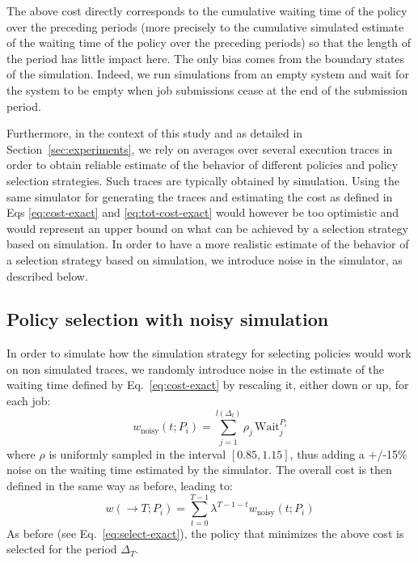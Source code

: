 \documentclass[sigconf,review,anonymous]{acmart}
\begin{document}
The above cost directly corresponds to the cumulative waiting time of the
policy over the preceding periods (more precisely to the cumulative simulated
estimate of the waiting time of the policy over the preceding periods) so that
the length of the period has little impact here. The only bias comes from the
boundary states of the simulation. Indeed, we run simulations from an empty
system and wait for the system to be empty when job submissions cease at the
end of the submission period.

Furthermore, in the context of this study and as detailed in
Section~\ref{sec:experiments}, we rely on averages over several execution
traces in order to obtain reliable estimate of the behavior of different
policies and policy selection strategies. Such traces are typically obtained by
simulation. Using the same simulator for generating the traces and estimating
the cost as defined in Eqs \ref{eq:cost-exact} and \ref{eq:tot-cost-exact}
would however be too optimistic and would represent an upper bound on what can
be achieved by a selection strategy based on simulation. In order to have a
more realistic estimate of the behavior of a selection strategy based on
simulation, we introduce noise in the simulator, as described below.

\subsection{Policy selection with noisy simulation}
\label{sub:noisy}

In order to simulate how the simulation strategy for selecting policies would
work on non simulated traces, we randomly introduce noise in the estimate of
the waiting time defined by Eq.~\ref{eq:cost-exact} by rescaling it, either
down or up, for each job:
%
\begin{equation} \label{eq:cost-noisy} w_{\mbox{noisy}}(t;P_i) =
\sum_{j=1}^{l(\Delta_t)} \rho_j \, \mbox{Wait}_j^{P_i} \end{equation}
%
where $\rho$ is uniformly sampled in the interval $[0.85,1.15]$, thus adding a
+/-15\% noise on the waiting time estimated by the simulator. The overall cost
is then defined in the same way as before, leading to:
%
\begin{equation} \label{eq:tot-cost-noisy} w(\rightarrow T;P_i) =
\sum_{t=0}^{T-1} \lambda^{T-1-t} w_{\mbox{noisy}}(t;P_i) \end{equation}
%
As before (see Eq.~\ref{eq:select-exact}), the policy that minimizes the above
cost is selected for the period $\Delta_T$.
\end{document}
